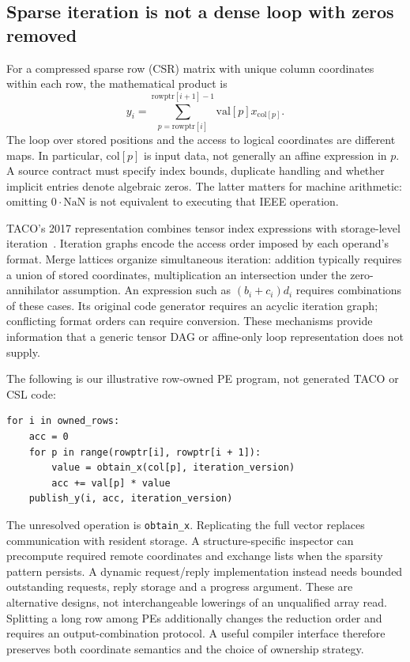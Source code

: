 \documentclass[final,3p,times,authoryear]{elsarticle}
\begin{document}
\subsection{Sparse iteration is not a dense loop with zeros removed}
For a compressed sparse row (CSR) matrix with unique column coordinates within each row, the mathematical product is
\begin{equation}\label{eq:csr}
 y_i=\sum_{p=\mathrm{rowptr}[i]}^{\mathrm{rowptr}[i+1]-1}
       \mathrm{val}[p]x_{\mathrm{col}[p]}.
\end{equation}
The loop over stored positions and the access to logical coordinates are different maps. In particular, $\mathrm{col}[p]$ is input data, not generally an affine expression in $p$. A source contract must specify index bounds, duplicate handling and whether implicit entries denote algebraic zeros. The latter matters for machine arithmetic: omitting $0\cdot\mathrm{NaN}$ is not equivalent to executing that IEEE operation.

TACO's 2017 representation combines tensor index expressions with storage-level iteration~\citep{taco2017}. Iteration graphs encode the access order imposed by each operand's format. Merge lattices organize simultaneous iteration: addition typically requires a union of stored coordinates, multiplication an intersection under the zero-annihilator assumption. An expression such as $(b_i+c_i)d_i$ requires combinations of these cases. Its original code generator requires an acyclic iteration graph; conflicting format orders can require conversion. These mechanisms provide information that a generic tensor DAG or affine-only loop representation does not supply.

The following is our illustrative row-owned PE program, not generated TACO or CSL code:

\begin{lstlisting}[float=htbp,caption={Sparse matrix--vector multiplication with an explicit remote-value contract.}]
for i in owned_rows:
    acc = 0
    for p in range(rowptr[i], rowptr[i + 1]):
        value = obtain_x(col[p], iteration_version)
        acc += val[p] * value
    publish_y(i, acc, iteration_version)
\end{lstlisting}

The unresolved operation is \texttt{obtain\_x}. Replicating the full vector replaces communication with resident storage. A structure-specific inspector can precompute required remote coordinates and exchange lists when the sparsity pattern persists. A dynamic request/reply implementation instead needs bounded outstanding requests, reply storage and a progress argument. These are alternative designs, not interchangeable lowerings of an unqualified array read. Splitting a long row among PEs additionally changes the reduction order and requires an output-combination protocol. A useful compiler interface therefore preserves both coordinate semantics and the choice of ownership strategy.
\end{document}
